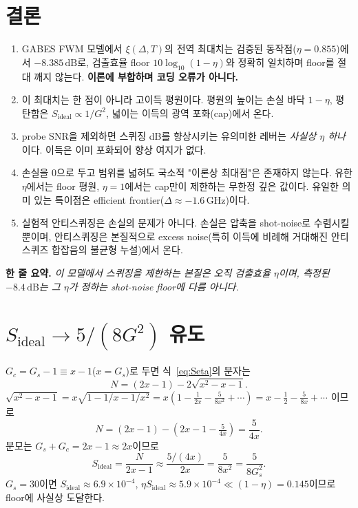 \documentclass[11pt,a4paper]{article}
\newcommand{\dB}{\,\mathrm{dB}}
\newcommand{\GHz}{\,\mathrm{GHz}}
\begin{document}
\section{결론}
\begin{enumerate}[nosep]
\item GABES FWM 모델에서 $\xi(\Delta,T)$의 전역 최대치는 검증된 동작점($\eta=0.855$)에서
      $-8.385\dB$로, 검출효율 floor $10\log_{10}(1-\eta)$와 정확히 일치하며 floor를 절대
      깨지 않는다. \textbf{이론에 부합하며 코딩 오류가 아니다.}
\item 이 최대치는 한 점이 아니라 고이득 평원이다. 평원의 높이는 손실 바닥 $1-\eta$, 평탄함은
      $S_{\mathrm{ideal}}\propto 1/G^2$, 넓이는 이득의 광역 포화(cap)에서 온다.
\item probe SNR을 제외하면 스퀴징 dB를 향상시키는 유의미한 레버는 \emph{사실상 $\eta$
      하나}이다. 이득은 이미 포화되어 향상 여지가 없다.
\item 손실을 $0$으로 두고 범위를 넓혀도 국소적 "이론상 최대점"은 존재하지 않는다. 유한
      $\eta$에서는 floor 평원, $\eta=1$에서는 cap만이 제한하는 무한정 깊은 값이다. 유일한
      의미 있는 특이점은 efficient frontier($\Delta\approx -1.6\GHz$)이다.
\item 실험적 안티스퀴징은 손실의 문제가 아니다. 손실은 압축을 shot-noise로 수렴시킬 뿐이며,
      안티스퀴징은 본질적으로 excess noise(특히 이득에 비례해 거대해진 안티스퀴즈 합잡음의
      불균형 누설)에서 온다.
\end{enumerate}

\noindent\textbf{한 줄 요약.} \emph{이 모델에서 스퀴징을 제한하는 본질은 오직 검출효율
$\eta$이며, 측정된 $-8.4\dB$는 그 $\eta$가 정하는 shot-noise floor에 다름 아니다.}

\appendix
\section{$S_{\mathrm{ideal}}\to 5/(8G^2)$ 유도}
\label{app:deriv}
$G_c=G_s-1\equiv x-1$($x=G_s$)로 두면 식~\eqref{eq:Seta}의 분자는
\begin{equation}
N = (2x-1)-2\sqrt{x^2-x-1}.
\end{equation}
$\sqrt{x^2-x-1}=x\sqrt{1-1/x-1/x^2}
= x\left(1-\tfrac{1}{2x}-\tfrac{5}{8x^2}+\cdots\right)
= x-\tfrac12-\tfrac{5}{8x}+\cdots$ 이므로
\begin{equation}
N=(2x-1)-\left(2x-1-\tfrac{5}{4x}\right)=\frac{5}{4x}.
\end{equation}
분모는 $G_s+G_c=2x-1\approx 2x$이므로
\begin{equation}
S_{\mathrm{ideal}}=\frac{N}{2x-1}\approx\frac{5/(4x)}{2x}=\frac{5}{8x^2}=\frac{5}{8G_s^2}.
\end{equation}
$G_s=30$이면 $S_{\mathrm{ideal}}\approx 6.9\times10^{-4}$, $\eta S_{\mathrm{ideal}}\approx
5.9\times10^{-4}\ll(1-\eta)=0.145$이므로 floor에 사실상 도달한다.
\end{document}
